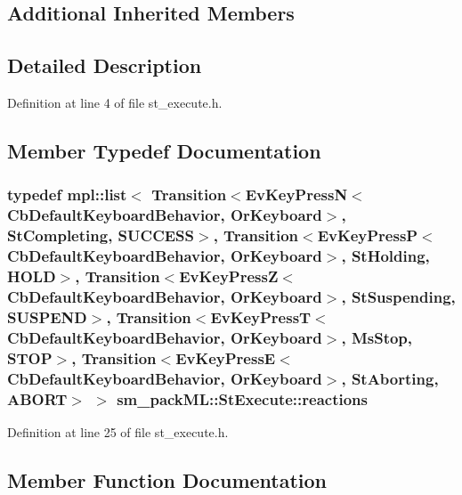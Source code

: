 \subsection*{Additional Inherited Members}


\subsection{Detailed Description}


Definition at line 4 of file st\+\_\+execute.\+h.



\subsection{Member Typedef Documentation}
\subsubsection[{\texorpdfstring{reactions}{reactions}}]{\setlength{\rightskip}{0pt plus 5cm}typedef mpl\+::list$<$ Transition$<$Ev\+Key\+PressN$<$Cb\+Default\+Keyboard\+Behavior, {\bf Or\+Keyboard}$>$, {\bf St\+Completing}, {\bf S\+U\+C\+C\+E\+SS}$>$, Transition$<$Ev\+Key\+PressP$<$Cb\+Default\+Keyboard\+Behavior, {\bf Or\+Keyboard}$>$, {\bf St\+Holding}, {\bf H\+O\+LD}$>$, Transition$<$Ev\+Key\+PressZ$<$Cb\+Default\+Keyboard\+Behavior, {\bf Or\+Keyboard}$>$, {\bf St\+Suspending}, {\bf S\+U\+S\+P\+E\+ND}$>$, Transition$<$Ev\+Key\+PressT$<$Cb\+Default\+Keyboard\+Behavior, {\bf Or\+Keyboard}$>$, {\bf Ms\+Stop}, {\bf S\+T\+OP}$>$, Transition$<$Ev\+Key\+PressE$<$Cb\+Default\+Keyboard\+Behavior, {\bf Or\+Keyboard}$>$, {\bf St\+Aborting}, {\bf A\+B\+O\+RT}$>$ $>$ {\bf sm\+\_\+pack\+M\+L\+::\+St\+Execute\+::reactions}}\hypertarget{structsm__packML_1_1StExecute_ad5e5ad84974f2f723cd1b9914ab161da}{}\label{structsm__packML_1_1StExecute_ad5e5ad84974f2f723cd1b9914ab161da}


Definition at line 25 of file st\+\_\+execute.\+h.



\subsection{Member Function Documentation}
